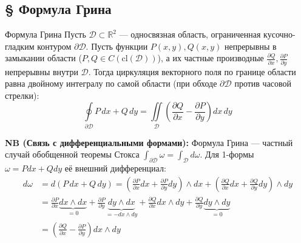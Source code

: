 \documentclass[12pt,a4paper]{article}
\begin{document}
\subsection{§ Формула Грина}

\begin{Theorem}{Формула Грина}{}
Пусть $\mathscr{D} \subset \mathbb{R}^2$ — односвязная область, ограниченная кусочно-гладким контуром $\partial\mathscr{D}$. Пусть функции $P(x,y), Q(x,y)$ непрерывны в замыкании области ($P, Q \in C(\text{cl}(\mathscr{D}))$), а их частные производные $\frac{\partial Q}{\partial x}, \frac{\partial P}{\partial y}$ непрерывны внутри $\mathscr{D}$.
Тогда циркуляция векторного поля по границе области равна двойному интегралу по самой области (при обходе $\partial\mathscr{D}$ против часовой стрелки):
$$ \oint\limits_{\partial\mathscr{D}} P \, dx + Q \, dy = \iint\limits_{\mathscr{D}} \left( \frac{\partial Q}{\partial x} - \frac{\partial P}{\partial y} \right) dx \, dy $$
\end{Theorem}

\noindent \textbf{NB (Связь с дифференциальными формами):} Формула Грина — частный случай обобщенной теоремы Стокса $\int_{\partial\mathscr{D}} \omega = \int_{\mathscr{D}} d\omega$. Для 1-формы $\omega = P dx + Q dy$ её внешний дифференциал:
\begin{align*}
    d\omega &= d(P \, dx + Q \, dy) = \left(\frac{\partial P}{\partial x} dx + \frac{\partial P}{\partial y} dy\right) \wedge dx + \left(\frac{\partial Q}{\partial x} dx + \frac{\partial Q}{\partial y} dy\right) \wedge dy \\
    &= \frac{\partial P}{\partial x} \underbrace{dx \wedge dx}_{=0} + \frac{\partial P}{\partial y} \underbrace{dy \wedge dx}_{=-dx \wedge dy} + \frac{\partial Q}{\partial x} dx \wedge dy + \frac{\partial Q}{\partial y} \underbrace{dy \wedge dy}_{=0} \\
    &= \left( \frac{\partial Q}{\partial x} - \frac{\partial P}{\partial y} \right) dx \wedge dy
\end{align*}
\end{document}
